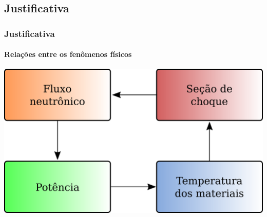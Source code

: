 \documentclass[svgnames,smaller,table]{beamer}
\begin{document}
%  
%
\subsection{Justificativa}
  \begin{frame}
    \frametitle{Justificativa}
    \framesubtitle{Relações entre os fenômenos físicos}
    \centering\includegraphics[scale=0.9]{../figuras/justificativa.png}
\end{frame}
\end{document}
